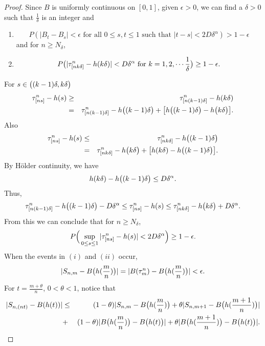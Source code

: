 \documentclass[11pt]{amsart}
\begin{document}
\begin{proof} Since $B$ is uniformly continuous on $[0,1]$, given $\epsilon >0$, we can find a $\delta >0$ such that $\frac{1}{\delta}$ is an integer and \\
\begin{enumerate}
\item
\[ P( \vert B_t - B_s \vert < \epsilon \mbox{ for all } 0 \leq s,t\leq 1 \mbox{ such that } \vert t-s  \vert < 2D \delta^{\alpha} ) > 1- \epsilon \]
and for $n \geq N_{\delta} $,
\item
\[ P\big{(} \vert \tau_{[n k \delta]}^{n} - h(k\delta) \vert < D\delta^{\alpha} \mbox{ for } k=1,2, \cdots \frac{1}{\delta}\big{)} \geq 1 - \epsilon .\]
\end{enumerate}
For $s \in \big{(} (k-1)\delta , k \delta \big{)}$
\begin{eqnarray*}
 \tau_{[ns]}^{n}-h(s) &\geq& \tau_{[n(k-1)\delta]}^n - h(k \delta)\\
&=& \tau_{[n(k-1)\delta]}^n - h\big{(} (k-1)\delta \big{)} + \big{[}h\big{(} (k-1)\delta \big{)} - h\big{(} k\delta \big{)} \big{]}.
\end{eqnarray*}
Also
\begin{eqnarray*}
 \tau_{[ns]}^{n}-h(s) &\leq& \tau_{[nk\delta]}^n - h\big{(}(k-1) \delta\big{)}\\
&=& \tau_{[nk\delta]}^n - h\big{(} k\delta \big{)} + \big{[}h (k\delta ) - h\big{(} (k-1)\delta \big{)} \big{]}.
\end{eqnarray*}
By H\"older continuity, we have
\[h (k\delta ) - h\big{(} (k-1)\delta \big{)} \leq D \delta^{\alpha} .\]
Thus,
\[ \tau_{[n(k-1)\delta]}^n-h\big{(} (k-1)\delta \big{)} - D \delta^{\alpha} \leq \tau_{[ns]}^{n}-h(s) \leq 
   \tau_{[nk\delta]}^n - h\big{(} k\delta \big{)} + D \delta^{\alpha}. \]
From this we can conclude that for $n \geq N_{\delta}$,
\[ P\Big{(} \sup_{0 \leq s \leq 1} \vert \tau_{[ns]}^n - h(s) \vert < 2D\delta^{\alpha} \Big{)} \geq 1 - \epsilon .\]
When the events in $(i)$ and $(ii)$ occur,
\[ \vert S_{n,m} - B\big{(}h(\frac{m}{n})\big{)} \vert = \vert B(\tau_{m}^n) - B\big{(}h(\frac{m}{n}) \big{)} \vert < \epsilon .\]
For $t= \frac{m+\theta}{n}$, $0<\theta < 1$, notice that
\begin{eqnarray*}
 \vert S_{n,(nt)} - B(h(t)) \vert &\leq& (1-\theta)\vert S_{n,m} - B\big{(}h(\frac{m}{n})\big{)} + \theta \vert S_{n,m+1} - B\big{(}h(\frac{m+1}{n})\big{)} \vert \\
&+& (1- \theta)\vert B\big{(}h(\frac{m}{n})\big{)} - B\big{(}h(t)\big{)} \vert + \theta \vert B\big{(}h(\frac{m+1}{n})\big{)} - B\big{(}h(t)\big{)} \vert .

\end{eqnarray*}
\end{proof}
\end{document}
